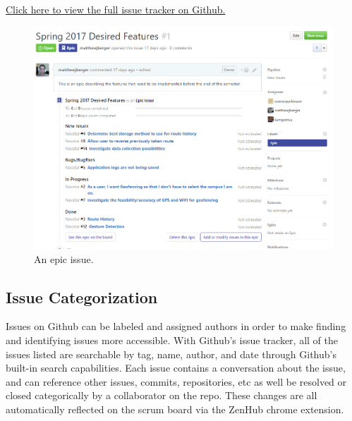 \documentclass{scrreprt}
\begin{document}
\href{https://github.com/matthewjberger/navatar/issues}{Click here to view the full issue tracker on Github.}

\begin{center}
\begin{figure}[ht!]
\includegraphics[width=\textwidth,height=\textheight,keepaspectratio]{epic.png}
\caption{An epic issue.}
\end{figure}
\end{center}

\pagebreak

\subsection{Issue Categorization}

Issues on Github can be labeled and assigned authors in order to make finding and identifying issues more accessible. With Github's issue tracker, all of the issues listed are searchable by tag, name, author, and date through Github's built-in search capabilities. Each issue contains a conversation about the issue, and can reference other issues, commits, repositories, etc as well be resolved or closed categorically by a collaborator on the repo. These changes are all automatically reflected on the scrum board via the ZenHub chrome extension.
\end{document}

